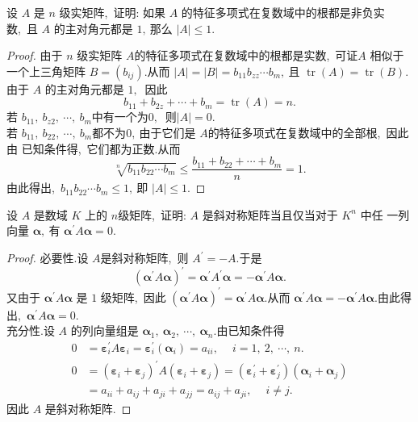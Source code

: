 \newpage
\begin{problem}
	设 $ A $ 是  $n$  级实矩阵,\  证明: 如果 $ A$  的特征多项式在复数域中的根都是非负实 数,\  且  $A $ 的主对角元都是 $1 ,\  $那么 $ |A| \leqslant 1  .$
\end{problem}
\begin{proof}
	由于  $n$  级实矩阵  $A  $的特征多项式在复数域中的根都是实数,\  可证$  A$  相似于一个上三角矩阵 $ B=\left(b_{i j}\right)  .$从而  $|A|=|B|=b_{11} b_{z z} \cdots b_{m} ,\  $且  $\operatorname{tr}(A)=\operatorname{tr}(B)  .$ 由于  $A $ 的主对角元都是 $1 ,\ $ 因此
	$$b_{11}+b_{2 z}+\cdots+b_{m}=\operatorname{tr}(A)=n .$$
	若 $ b_{11},\  b_{z 2},\  \cdots,\  b_{m}  $中有一个为$ 0 ,\ $ 则$  |A|=0 .$\\
	若 $ b_{11},\  b_{22},\  \cdots,\  b_{m}  $都不为$ 0 ,\  $由于它们是  $A  $的特征多项式在复数域中的全部根,\  因此由 已知条件得,\  它们都为正数.从而
	$$\sqrt[n]{b_{11} b_{22} \cdots b_{m}} \leqslant \frac{b_{11}+b_{22}+\cdots+b_{m}}{n}=1 .$$
	由此得出,\  $ b_{11} b_{22} \cdots b_{m} \leqslant 1 ,\  $即 $ |A| \leqslant 1 .$
\end{proof}
\newpage
\begin{problem}
	设  $A $ 是数域 $ K $ 上的 $ n  $级矩阵,\  证明: $ A$  是斜对称矩阵当且仅当对于  $K^{n} $ 中任 一列向量  $\boldsymbol{\alpha} ,\  $有  $\boldsymbol{\alpha}^{\prime} A \boldsymbol{\alpha}=0 .$
\end{problem}
\begin{proof}
	必要性.设  $A  $是斜对称矩阵,\  则 $ A^{\prime}=-A .$于是
	$$\left(\boldsymbol{\alpha}^{\prime} A \boldsymbol{\alpha}\right)^{\prime}=\boldsymbol{\alpha}^{\prime} A^{\prime} \boldsymbol{\alpha}=-\boldsymbol{\alpha}^{\prime} A \boldsymbol{\alpha} .$$
	又由于  $\boldsymbol{\alpha}^{\prime} A \boldsymbol{\alpha} $ 是 $1$ 级矩阵,\  因此 $ \left(\boldsymbol{\alpha}^{\prime} A \boldsymbol{\alpha}\right)^{\prime}=\boldsymbol{\alpha}^{\prime} A \boldsymbol{\alpha}  .$从而  $\boldsymbol{\alpha}^{\prime} A \boldsymbol{\alpha}=-\boldsymbol{\alpha}^{\prime} A \boldsymbol{\alpha} . $由此得出,\   $\boldsymbol{\alpha}^{\prime} A \boldsymbol{\alpha}=0 .$\\
	充分性.设  $A $ 的列向量组是  $\boldsymbol{\alpha}_{1},\  \boldsymbol{\alpha}_{2},\  \cdots,\  \boldsymbol{\alpha}_{n}  .$由已知条件得
	$$\begin{aligned}
		0 & =\boldsymbol{\varepsilon}_{i}^{\prime} A \boldsymbol{\varepsilon}_{i}=\boldsymbol{\varepsilon}_{i}^{\prime}\left(\boldsymbol{\alpha}_{i}\right)=a_{i i},\  \quad i=1,\ 2,\  \cdots,\  n . \\
		0 & =\left(\boldsymbol{\varepsilon}_{i}+\boldsymbol{\varepsilon}_{j}\right)^{\prime} A\left(\boldsymbol{\varepsilon}_{i}+\boldsymbol{\varepsilon}_{j}\right)=\left(\boldsymbol{\varepsilon}_{i}^{\prime}+\boldsymbol{\varepsilon}_{j}^{\prime}\right)\left(\boldsymbol{\alpha}_{i}+\boldsymbol{\alpha}_{j}\right) \\
		& =a_{i i}+a_{i j}+a_{j i}+a_{j j}=a_{i j}+a_{j i},\  \quad i \neq j .
	\end{aligned}$$
	因此 $ A$  是斜对称矩阵.
\end{proof}
